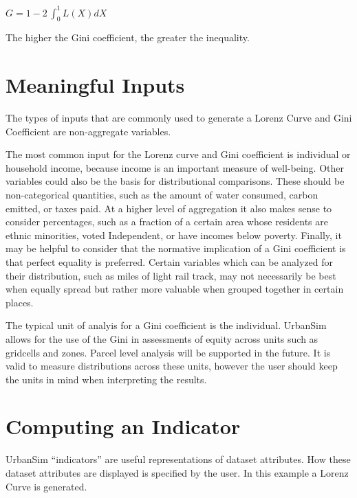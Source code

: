 \documentclass{howto}
\begin{document}
    $G = 1 - 2\,\int_0^1 L(X) dX$ 

The higher the Gini coefficient, the greater the inequality.


\section*{Meaningful Inputs}

The types of inputs that are commonly used to generate a Lorenz Curve and 
Gini Coefficient are non-aggregate variables. 

The most common input for the Lorenz curve and Gini coefficient is individual or household
income, because income is an important measure of well-being.  Other variables
could also be the basis for distributional comparisons.  These should be
non-categorical quantities, such as the amount of water consumed, carbon emitted, or 
taxes paid.  At a higher level of aggregation it also makes sense to consider
percentages, such as a fraction of a certain area whose residents are ethnic
minorities, voted Independent, or have incomes below poverty.  Finally, it may be
helpful to consider that the normative implication of a Gini coefficient is that perfect 
equality is preferred.  Certain variables which can be analyzed for their distribution, such as miles of light rail track,
may not necessarily be best when equally spread but rather more valuable when
grouped together in certain places.

The typical unit of analyis for a Gini coefficient is the individual.  UrbanSim allows for the use of the Gini
in assessments of equity across units such as gridcells and zones.  Parcel level
analysis will be supported in the future.  It is valid to measure distributions across 
these units, however the user should keep the units in mind when interpreting the results.

\section*{Computing an Indicator}

UrbanSim ``indicators'' are useful representations of dataset attributes.  
How these dataset attributes are displayed is specified by the user.  
In this example a Lorenz Curve is generated.
\end{document}
